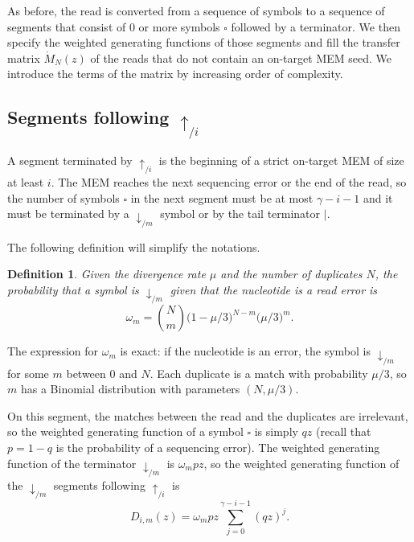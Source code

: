 \documentclass{article}
\newtheorem{definition}{Definition}
\begin{document}
As before, the read is converted from a sequence of symbols to a sequence
of segments that consist of 0 or more symbols $\square$ followed by a
terminator. We then specify the weighted generating functions of those
segments and fill the transfer matrix $\mathring{M}_N(z)$ of the reads that
do not contain an on-target MEM seed. We introduce the terms of the matrix
by increasing order of complexity.


\subsection{Segments following $\uparrow_{/i}$}

A segment terminated by $\uparrow_{/i}$ is the beginning of a strict
on-target MEM of size at least $i$. The MEM reaches the next sequencing
error or the end of the read, so the number of symbols $\square$ in the
next segment must be at most $\gamma-i-1$ and it must be terminated by a
$\downarrow_{/m}$ symbol or by the tail terminator $|$.

The following definition will simplify the notations.

\begin{definition}
Given the divergence rate $\mu$ and the number of duplicates $N$, the
probability that a symbol is $\downarrow_{/m}$ given that the nucleotide
is a read error is
\begin{equation}
\label{eq:omega}
\omega_m = {N \choose m} \big(1 - \mu/3\big)^{N-m} \big(\mu/3\big)^m.
\end{equation}
\end{definition}

The expression for $\omega_m$ is exact: if the nucleotide is an error,
the symbol is $\downarrow_{/m}$ for some $m$ between 0 and $N$. Each
duplicate is a match with probability $\mu/3$, so $m$ has a Binomial
distribution with parameters $(N, \mu/3)$.

On this segment, the matches between the read and the duplicates are
irrelevant, so the weighted generating function of a symbol $\square$ is
simply $qz$ (recall that $p = 1-q$ is the probability of a sequencing
error). The weighted generating function of the terminator
$\downarrow_{/m}$ is $\omega_m pz$, so the weighted generating function of
the $\downarrow_{/m}$ segments following $\uparrow_{/i}$ is
\begin{equation}
\label{eq:D}
D_{i,m}(z) = \omega_m pz \sum_{j=0}^{\gamma-i-1} (qz)^j.
\end{equation}
\end{document}
